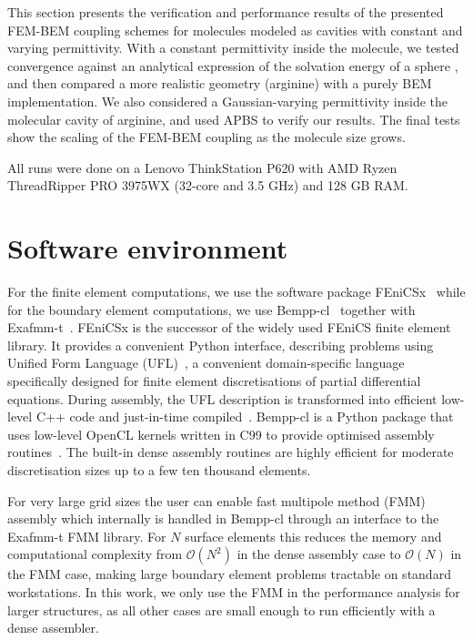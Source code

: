 This section presents the verification and performance results of the presented FEM-BEM coupling schemes for molecules modeled as cavities with constant and varying permittivity.
With a constant permittivity inside the molecule, we tested convergence against an analytical expression of the solvation energy of a sphere \cite{Kirkwood1934}, and then compared a more realistic geometry (arginine) with a purely BEM implementation.
We also considered a Gaussian-varying permittivity\cite{grant2001smooth,li2013dielectric} inside the molecular cavity of arginine, and used APBS \cite{BakerETal2001} to verify our results.
The final tests show the scaling of the FEM-BEM coupling as the molecule size grows. 

All runs were done on a Lenovo ThinkStation P620 with AMD Ryzen ThreadRipper PRO 3975WX (32-core and 3.5 GHz) and 128 GB RAM. 

\section*{\sffamily \Large Software environment}

For the finite element computations, we use the software package FEniCSx~\cite{BasixJoss,BasixDofTransformations} while for the boundary element computations, we use Bempp-cl~\cite{BetckeScroggs2021} together with Exafmm-t~\cite{exafmm-t}. FEniCSx is the successor of the widely used FEniCS finite element library\cite{FEniCS,FEniCS-book}.
It provides a convenient Python interface, describing problems using Unified Form Language (UFL)~\cite{UFL}, a convenient domain-specific language specifically designed for finite element discretisations of partial differential equations. During assembly, the UFL description is transformed into efficient low-level C++ code and just-in-time compiled~\cite{ffc1,ffc2}. Bempp-cl is a Python package that uses low-level OpenCL kernels written in C99 to provide optimised assembly routines~\cite{2021-cise}. The built-in dense assembly routines are highly efficient for moderate discretisation sizes up to a few ten thousand elements.

For very large grid sizes the user can enable fast multipole method (FMM) assembly which internally is handled in Bempp-cl through an interface to the Exafmm-t FMM library. For $N$ surface elements this reduces the memory and computational complexity from $\mathcal{O}(N^2)$ in the dense assembly case to $\mathcal{O}(N)$ in the FMM case, making large boundary element problems tractable on standard workstations. In this work, we only use the FMM in the performance analysis for larger structures, as all other cases are small enough to run efficiently with a dense assembler. 

